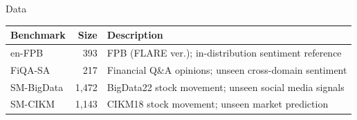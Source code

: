 \documentclass[final]{beamer}
\newlength{\colwidth}
\begin{document}
\begin{frame}[t]
\begin{columns}[t]
\begin{column}{\colwidth}
\begin{exampleblock}{Data}

    \begin{table}
      \centering\small
      \begin{tabularx}{\linewidth}{@{}lrX@{}}
        \toprule
        \textbf{Benchmark} & \textbf{Size} & \textbf{Description} \\
        \midrule
        en-FPB     &   393 & FPB (FLARE ver.); in-distribution sentiment reference \\[0.3ex]
        FiQA-SA    &   217 & Financial Q\&A opinions; unseen cross-domain sentiment \\[0.3ex]
        SM-BigData & 1,472 & BigData22 stock movement; unseen social media signals \\[0.3ex]
        SM-CIKM    & 1,143 & CIKM18 stock movement; unseen market prediction \\
        \bottomrule
      \end{tabularx}
    \end{table}







\end{exampleblock}
\end{column}
\end{columns}
\end{frame}
\end{document}
